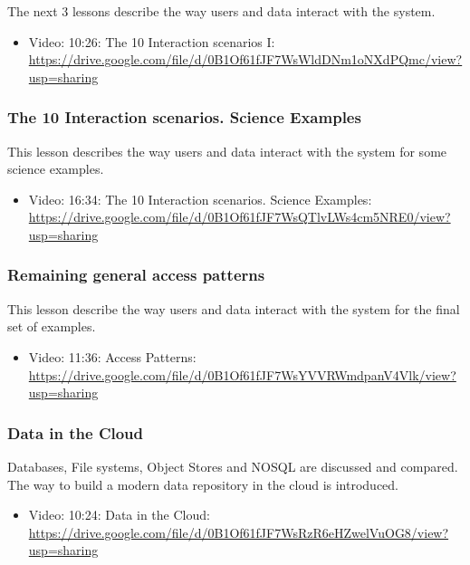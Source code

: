 The next 3 lessons describe the way users and data interact with the
system.

\begin{itemize}
\tightlist
\item
  Video: 10:26: The 10 Interaction scenarios I:
  \url{https://drive.google.com/file/d/0B1Of61fJF7WsWldDNm1oNXdPQmc/view?usp=sharing}
\end{itemize}

\subsubsection{The 10 Interaction scenarios. Science
Examples}\label{the-10-interaction-scenarios.-science-examples}

This lesson describes the way users and data interact with the system
for some science examples.

\begin{itemize}
\tightlist
\item
  Video: 16:34: The 10 Interaction scenarios. Science Examples:
  \url{https://drive.google.com/file/d/0B1Of61fJF7WsQTlvLWs4cm5NRE0/view?usp=sharing}
\end{itemize}

\subsubsection{Remaining general access
patterns}\label{remaining-general-access-patterns}

This lesson describe the way users and data interact with the system for
the final set of examples.

\begin{itemize}
\tightlist
\item
  Video: 11:36: Access Patterns:
  \url{https://drive.google.com/file/d/0B1Of61fJF7WsYVVRWmdpanV4Vlk/view?usp=sharing}
\end{itemize}

\subsubsection{Data in the Cloud}\label{data-in-the-cloud}

Databases, File systems, Object Stores and NOSQL are discussed and
compared. The way to build a modern data repository in the cloud is
introduced.

\begin{itemize}
\tightlist
\item
  Video: 10:24: Data in the Cloud:
  \url{https://drive.google.com/file/d/0B1Of61fJF7WsRzR6eHZwelVuOG8/view?usp=sharing}
\end{itemize}

